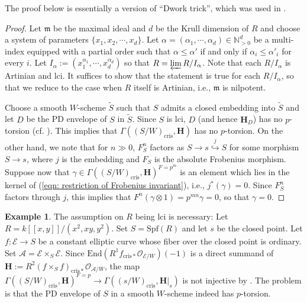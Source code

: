 \documentclass[letter, 11pt]{article}
\theoremstyle{plain}
\theoremstyle{definition}
\newtheorem{example}[subsubsection]{Example}
\newcommand{\IN}{\mathbb{N}}
\newcommand{\End}{\mathrm{End}}
\newcommand\tensor{{\otimes}}
\newcommand{\<}{\langle}
\renewcommand{\>}{\rangle}
\newcommand{\into}{\hookrightarrow}
\def\wt{\widetilde}
\newcommand{\sE}{\mathcal{E}}
\newcommand{\sO}{\mathcal{O}}
\newcommand{\Spf}{\mathrm{Spf}}
\newcommand{\cris}{\mathrm{cris}}
\newcommand{\bH}{\mathbf{H}}
\newcommand{\sA}{\mathcal{A}}
\newcommand{\fm}{\mathfrak{m}}
\begin{document}
The proof below is essentially a version of ``Dwork trick'', which was used in \cite{BO}. 
\begin{proof}
    Let $\fm$ be the maximal ideal and $d$ be the Krull dimension of $R$ and choose a system of parameters $\{x_1, x_2, \cdots, x_d\}$. Let $\alpha = (\alpha_1, \cdots, \alpha_d) \in \IN_{>0}^{d}$ be a multi-index equipped with a partial order such that $\alpha \le \alpha'$ if and only if $\alpha_i \le \alpha'_i$ for every $i$. Let $I_\alpha := (x_1^{\alpha_1}, \cdots, x_d^{\alpha_d})$ so that $R = \varprojlim R/ I_\alpha$. Note that each $R/ I_\alpha$ is Artinian and lci. It suffices to show that the statement is true for each $R / I_\alpha$, so that we reduce to the case when $R$ itself is Artinian, i.e., $\fm$ is nilpotent.
    
    Choose a smooth $W$-scheme $\wt{S}$ such that $S$ admits a closed embedding into $\wt{S}$ and let $D$ be the PD envelope of $S$ in $\wt{S}$. Since $S$ is lci, $D$ (and hence $\bH_D$) has no $p$-torsion (cf. \cite[Rmk~1.10(i)]{BO}). This implies that $\Gamma((S/W)_\cris, \bH)$ has no $p$-torsion. On the other hand, we note that for $n \gg 0$, $F_S^n$ factors as $S \to s \stackrel{j}{\into} S$ for some morphism $S \to s$, where $j$ is the embedding and $F_S$ is the absolute Frobenius morphism. Suppose now that $\gamma \in \Gamma((S/W)_\cris, \bH)^{F = p^m}$ is an element which lies in the kernel of (\ref{eqn: restriction of Frobenius invariant}), i.e., $j^*(\gamma) = 0$. Since $F_S^n$ factors through $j$, this implies that $F^n(\gamma \tensor 1) = p^{mn} \gamma = 0$, so that $\gamma = 0$. 
\end{proof} 



\begin{example}
    The assumption on $R$ being lci is necessary: Let $R = k[\![x, y]\!]/ (x^2, xy, y^2)$. Set $S = \Spf(R)$ and let $s$ be the closed point. Let $f : \sE \to S$ be a constant elliptic curve whose fiber over the closed point is ordinary. Set $\mathcal{A} = \sE \times_S \sE$. Since $\End (R^1 f_{\cris*} \sO_{\sE/W})(-1)$ is a direct summand of $\bH := R^2 (f \times_S f)_{\cris *} \sO_{\sA/W}$, the map $\Gamma((S/W)_\cris, \bH)^{F = p} \to \Gamma((s/W)_\cris, \bH|_{s})$ is not injective by \cite[(A.4)]{BO}. The problem is that the PD envelope of $S$ in a smooth $W$-scheme indeed has $p$-torsion. 
\end{example}
\end{document}
